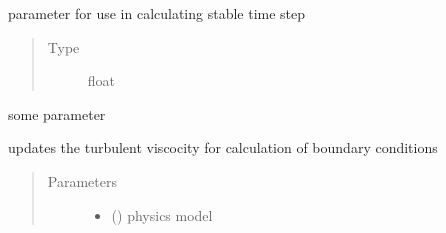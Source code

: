 \documentclass[letterpaper,10pt,english]{sphinxmanual}
\begin{document}
\begin{fulllineitems}
\begin{fulllineitems}
\begin{quote}
\begin{description}
\end{description}\end{quote}

\end{fulllineitems}


\begin{fulllineitems}
\label{\detokenize{autoapi/NS_Airfoil/index:NS_Airfoil.NS_Airfoil.local_timestepping}}
\sphinxAtStartPar
parameter for use in calculating stable time step
\begin{quote}\begin{description}
\item[{Type}] \leavevmode
\sphinxAtStartPar
float

\end{description}\end{quote}

\end{fulllineitems}


\begin{fulllineitems}
\label{\detokenize{autoapi/NS_Airfoil/index:NS_Airfoil.NS_Airfoil.bc}}
\sphinxAtStartPar
some parameter

\end{fulllineitems}


\begin{fulllineitems}
\label{\detokenize{autoapi/NS_Airfoil/index:NS_Airfoil.NS_Airfoil.update_physics}}
\sphinxAtStartPar
updates the turbulent viscocity for calculation of boundary conditions
\begin{quote}\begin{description}
\item[{Parameters}] \leavevmode\begin{itemize}
\item {} 
\sphinxAtStartPar
{} ({\hyperref[\detokenize{autoapi/NavierStokes/index:NavierStokes.NavierStokes}]{}}) \textendash{} physics model


\end{itemize}
\end{description}
\end{quote}
\end{fulllineitems}
\end{fulllineitems}
\end{document}
